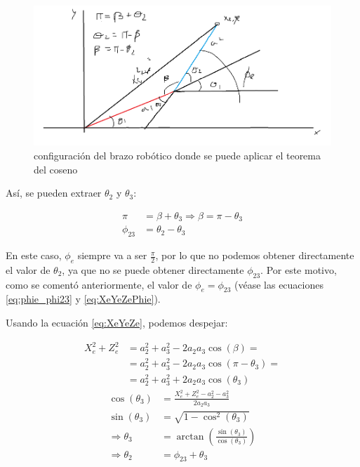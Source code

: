 \documentclass[a4paper,12pt]{article}
\begin{document}
\begin{figure}[H]
    \centering
    \includegraphics[width=.8\textwidth]{images/trigonometry.PNG}
    \caption{configuración del brazo robótico donde se puede aplicar el teorema del coseno}
    \label{fig:cos_theorem}
\end{figure}

Así, se pueden extraer $\theta_2$ y $\theta_3$:

\begin{align}
    \pi    & = \beta + \theta_3 \Longrightarrow \beta = \pi - \theta_3 \\
    \phi_{23} & = \theta_2 - \theta_3
\end{align}

En este caso, $\phi_e$ siempre va a ser $\frac{\pi}{2}$, por lo que no podemos obtener
directamente el valor de $\theta_2$, ya que no se puede obtener directamente $\phi_{23}$.
Por este motivo, como se comentó anteriormente, el valor de $\phi_e = \phi_{23}$
(véase las ecuaciones \ref{eq:phie_phi23} y \ref{eq:XeYeZePhie}).

Usando la ecuación \ref{eq:XeYeZe}, podemos despejar:

\begin{align*}
    X_e^2 + Z_e^2 & = a_2^2 + a_3^2 - 2a_2a_3\cos(\beta) =          \\
                  & = a_2^2 + a_3^2 - 2a_2a_3\cos(\pi - \theta_3) = \\
                  & = a_2^2 + a_3^2 + 2a_2a_3\cos(\theta_3)
\end{align*}
\begin{align}
    \cos(\theta_3)           & = \frac{X_e^2 + Z_e^2 - a_2^2 - a_3^2}{2a_2a_3} \label{eq:cos_theta_3} \\
    \sin(\theta_3)           & = \sqrt{1 - \cos^2(\theta_3)} \label{eq:sin_theta_3}                   \\
    \Longrightarrow \theta_3 & = \arctan\left(\frac{\sin(\theta_3)}{\cos(\theta_3)}\right)
    \label{eq:theta_3}                                                                                \\
    \Longrightarrow \theta_2 & = \phi_{23} + \theta_3 \label{eq:theta_2}
\end{align}
\end{document}
